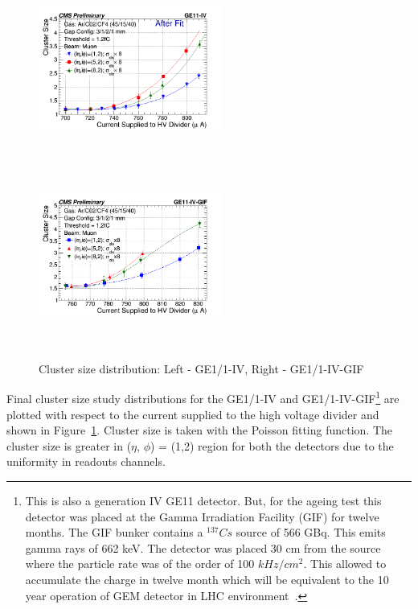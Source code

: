 \begin{figure}[!htbp]
   \begin{center}
     \includegraphics[width=6cm,height=6cm]{figures/GEM/CurrentvsClusterSizeAll3EtaPhi.png}
     \includegraphics[width=6cm,height=6cm]{figures/GEM/CurrentvsClusterSizeAll3EtaPhiGE11IVGIF.png}
   \end{center}
   \caption{Cluster size distribution: Left - GE1/1-IV, Right - GE1/1-IV-GIF}
   \label{fig:CSDGE1/1}
\end{figure}
Final cluster size study distributions for the GE1/1-IV and GE1/1-IV-GIF\footnote{This is also a generation IV GE11 detector. But, for the ageing test this detector was placed at the Gamma Irradiation Facility (GIF) for twelve months. The GIF bunker contains a $^{137}Cs$ source of 566 GBq. This emits gamma rays of 662 keV. The detector was placed 30 cm from the source where the particle rate was of the order of 100 $kHz/cm^2$. This allowed to accumulate the charge in twelve month which will be equivalent to the 10 year operation of GEM detector in LHC environment~\cite{Merlin2013}.} are plotted with respect to the current supplied to the high voltage divider and shown in Figure~\ref{fig:CSDGE1/1}.
Cluster size is taken with the Poisson fitting function. The cluster size is greater in ($\eta$, $\phi$) = (1,2) region for both the detectors due to the uniformity in readouts channels.

